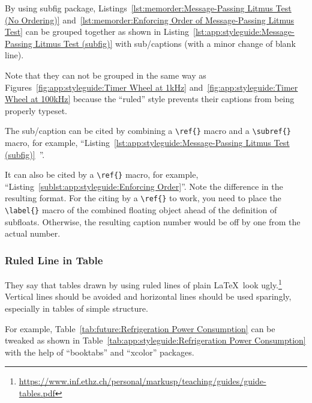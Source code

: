 By using subfig package,
Listings~\ref{lst:memorder:Message-Passing Litmus Test (No Ordering)}
and~\ref{lst:memorder:Enforcing Order of Message-Passing Litmus Test}
can be grouped together as shown in
Listing~\ref{lst:app:styleguide:Message-Passing Litmus Test (subfig)}
with sub\-/captions (with a minor change of blank line).

Note that they can not be grouped in the same way as
Figures~\ref{fig:app:styleguide:Timer Wheel at 1kHz}
and~\ref{fig:app:styleguide:Timer Wheel at 100kHz}
because the ``ruled'' style prevents their captions
from being properly typeset.

The sub\-/caption can be cited by combining a \verb|\ref{}| macro
and a \verb|\subref{}| macro, for example,
``Listing~\ref{lst:app:styleguide:Message-Passing Litmus Test (subfig)}\,%
''.

It can also be cited by a \verb|\ref{}| macro, for example,
``Listing~\ref{sublst:app:styleguide:Enforcing Order}''.
Note the difference in the resulting format. For the citing by
a \verb|\ref{}| to work, you need to place the \verb|\label{}|
macro of the combined floating object ahead of the definition of
subfloats.
Otherwise, the resulting caption number would be off by one
from the actual number.

\subsubsection{Ruled Line in Table}
\label{sec:app:styleguide:Ruled Line in Table}

They say that tables drawn by using ruled lines of plain \LaTeX\
look ugly.\footnote{
  \url{https://www.inf.ethz.ch/personal/markusp/teaching/guides/guide-tables.pdf}
}
Vertical lines should be avoided and horizontal lines should be
used sparingly, especially in tables of simple structure.

\captionsetup[table]{position=top,hangindent=30pt}
\renewcommand*{\abovetopsep}{-7pt}

For example,
Table~\ref{tab:future:Refrigeration Power Consumption}
can be tweaked as shown in
Table~\ref{tab:app:styleguide:Refrigeration Power Consumption}
with the help of ``booktabs'' and ``xcolor'' packages.

